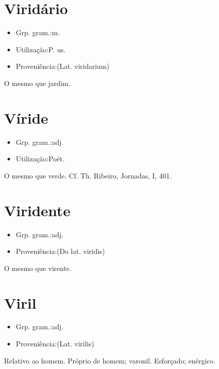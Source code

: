 \documentclass{article}
\begin{document}
\section{Viridário}
\begin{itemize}
\item {Grp. gram.:m.}
\end{itemize}
\begin{itemize}
\item {Utilização:P. us.}
\end{itemize}
\begin{itemize}
\item {Proveniência:(Lat. \textunderscore viridarium\textunderscore )}
\end{itemize}
O mesmo que \textunderscore jardim\textunderscore .
\section{Víride}
\begin{itemize}
\item {Grp. gram.:adj.}
\end{itemize}
\begin{itemize}
\item {Utilização:Poét.}
\end{itemize}
O mesmo que \textunderscore verde\textunderscore . Cf. Th. Ribeiro, \textunderscore Jornadas\textunderscore , I, 401.
\section{Viridente}
\begin{itemize}
\item {Grp. gram.:adj.}
\end{itemize}
\begin{itemize}
\item {Proveniência:(Do lat. \textunderscore viridis\textunderscore )}
\end{itemize}
O mesmo que \textunderscore virente\textunderscore .
\section{Viril}
\begin{itemize}
\item {Grp. gram.:adj.}
\end{itemize}
\begin{itemize}
\item {Proveniência:(Lat. \textunderscore virilis\textunderscore )}
\end{itemize}
Relativo ao homem.
Próprio de homem; varonil.
Esforçado; enérgico.
\end{document}
